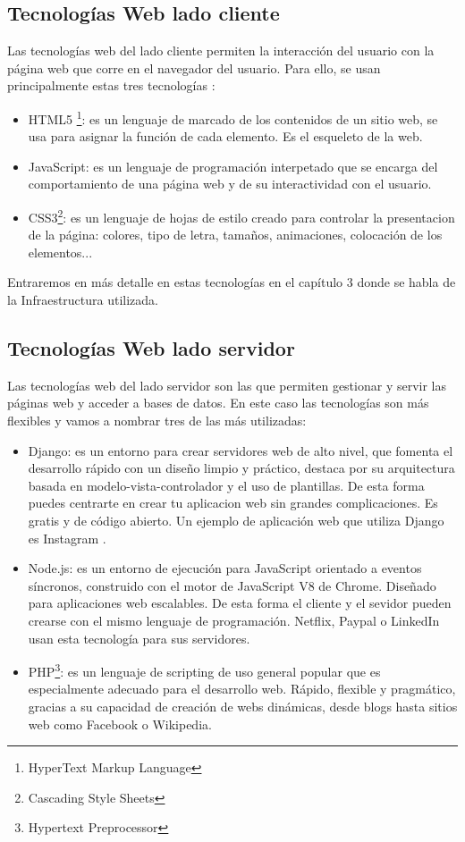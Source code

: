 \subsection{Tecnologías Web lado cliente}
Las tecnologías web del lado cliente  permiten la interacción del usuario con la página web que corre en el navegador del usuario. Para ello, se usan principalmente estas tres tecnologías \cite{tecnologiascliente}:

\begin{itemize}
  \item HTML5 \footnote{HyperText Markup Language}: es un lenguaje de marcado de los contenidos de un sitio web, se usa para asignar la función de cada elemento. Es el esqueleto de la web.
  \item JavaScript: es un lenguaje de programación interpetado que se encarga del comportamiento de una página web y de su interactividad con el usuario.
  \item CSS3\footnote{Cascading Style Sheets}: es un lenguaje de hojas de estilo creado para controlar la presentacion de la página: colores, tipo de letra, tamaños, animaciones, colocación de los elementos...
\end{itemize}

Entraremos en más detalle en estas tecnologías en el capítulo 3 donde se habla de la Infraestructura utilizada.

\newpage
\subsection{Tecnologías Web lado servidor}
Las tecnologías web del lado servidor son las que permiten gestionar y servir las páginas web y acceder a bases de datos. En este caso las tecnologías son más flexibles y vamos a nombrar tres de las más utilizadas:

\begin{itemize}
    \item Django: es un entorno para crear servidores web de alto nivel, que fomenta el desarrollo rápido con un diseño limpio y práctico, destaca por su arquitectura basada en  modelo-vista-controlador y el uso de plantillas. De esta forma puedes centrarte en crear tu aplicacion web sin grandes complicaciones. Es gratis y de código abierto\cite{django}. Un ejemplo de aplicación web que utiliza Django es Instagram \cite{insta}.
    \item Node.js: es un entorno de ejecución para JavaScript orientado a eventos síncronos, construido con el motor de JavaScript V8 de Chrome. Diseñado para aplicaciones web escalables. De esta forma el cliente y el sevidor pueden crearse con el mismo lenguaje de programación\cite{node}. Netflix, Paypal o LinkedIn usan esta tecnología para sus servidores\cite{nodenetflix}. 
    
    \item PHP\footnote{Hypertext Preprocessor}: es un lenguaje de scripting de uso general popular que es especialmente adecuado para el desarrollo web\cite{php1}. Rápido, flexible y pragmático, gracias a su capacidad de creación de webs dinámicas, desde blogs hasta sitios web como Facebook o Wikipedia\cite{php2}.
    
\end{itemize}

